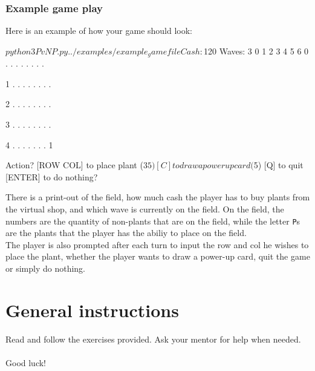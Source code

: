 \documentclass{42-en}
\begin{document}
    \subsection {Example game play}
     Here is an example of how your game should look:
     \begin{42console}
$python3 PvNP.py ../examples/example_gamefile
Cash: $120
Waves: 3
   0  1  2  3  4  5  6
0  .  .  .  .  .  .  .  .

1  .  .  .  .  .  .  .  .

2  .  .  .  .  .  .  .  .

3  .  .  .  .  .  .  .  .

4  .  .  .  .  .  .  .  1


Action?
        [ROW COL] to place plant ($35)
        [C] to draw a powerup card ($5)
        [Q] to quit
        [ENTER] to do nothing?\end{42console}
There is a print-out of the field, how much cash the player has to buy plants from the virtual shop, 
and which wave is currently on the field. On the field, the numbers are the quantity of non-plants that are on the field, 
while the letter \texttt{P}s are the plants that the player has the abiliy to place on the field. 
\\
The player is also prompted after each turn to input the row and col he wishes to place the plant, whether the  player wants to draw a power-up card, quit the game or simply do nothing.
\\




\chapter{General instructions}

    Read and follow the exercises provided. Ask your mentor for help when needed. 
    \\
    \\ 
    Good luck!
\end{document}
